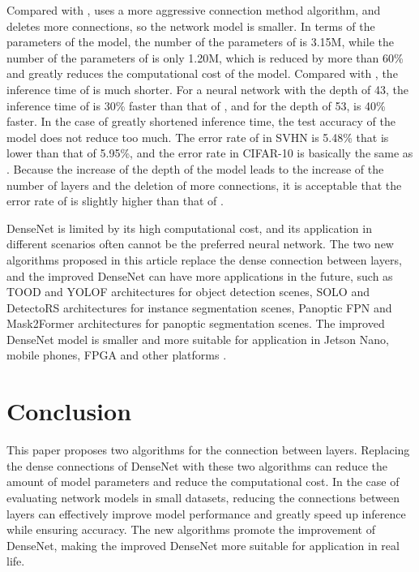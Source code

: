 \documentclass[conference]{IEEEtran}
\begin{document}
Compared with ,  uses a more aggressive connection method algorithm, and deletes more connections, so the network model is smaller. In terms of the parameters of the model, the number of the parameters of  is 3.15M, while the number of the parameters of  is only 1.20M, which is reduced by more than 60\% and greatly reduces the computational cost of the model. Compared with , the inference time of   is much shorter. For a neural network with the depth of 43, the inference time of  is 30\% faster than that of , and for the depth of 53,  is 40\% faster. In the case of greatly shortened inference time, the test accuracy of the model does not reduce too much. The error rate of  in SVHN is 5.48\% that is lower than that of  5.95\%, and the error rate in CIFAR-10 is basically the same as . Because the increase of the depth of the model leads to the increase of the number of layers and the deletion of more connections, it is acceptable that the error rate of  is slightly higher than that of .

DenseNet is limited by its high computational cost, and its application in different scenarios often cannot be the preferred neural network. The two new algorithms proposed in this article replace the dense connection between layers, and the improved DenseNet can have more applications in the future, such as TOOD \cite{feng2021tood} and YOLOF \cite{chen2021you} architectures for object detection scenes, SOLO \cite{wang2020solo} and DetectoRS \cite{qiao2021detectors} architectures for instance segmentation scenes, Panoptic FPN \cite{kirillov2019panoptic} and Mask2Former \cite{cheng2022masked} architectures for panoptic segmentation scenes. The improved DenseNet model is smaller and more suitable for application in Jetson Nano, mobile phones, FPGA and other platforms \cite{ju2022triplenet}. 

\section{Conclusion}
This paper proposes two algorithms for the connection between layers. Replacing the dense connections of DenseNet with these two algorithms can reduce the amount of model parameters and reduce the computational cost. In the case of evaluating network models in small datasets, reducing the connections between layers can effectively improve model performance and greatly speed up inference while ensuring accuracy. The new algorithms promote the improvement of DenseNet, making the improved DenseNet more suitable for application in real life.




\vspace{12pt}
\end{document}
